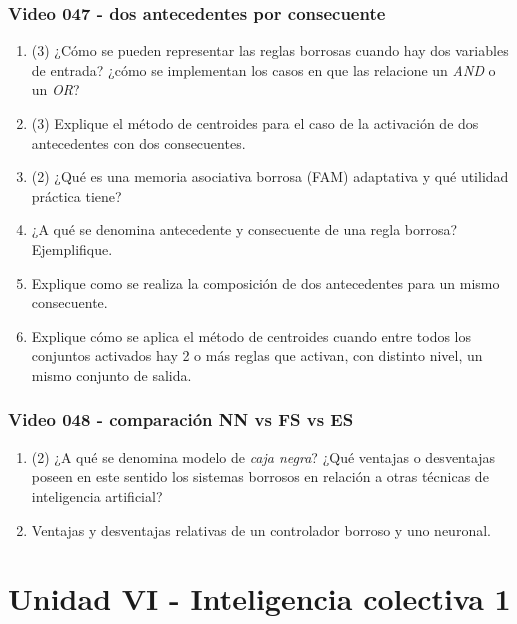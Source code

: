 \documentclass[a4paper,10pt,spanish]{article}
\begin{document}
\subsubsection{Video 047 - dos antecedentes por consecuente}

\begin{enumerate}
\item (3) ¿Cómo se pueden representar las reglas borrosas cuando hay dos variables de entrada? ¿cómo se implementan los casos en que las relacione un \textit{AND} o un \textit{OR}?

\item (3) Explique el método de centroides para el caso de la activación de dos antecedentes con dos consecuentes.

\item (2) ¿Qué es una memoria asociativa borrosa (FAM) adaptativa y qué utilidad práctica tiene?

\item ¿A qué se denomina antecedente y consecuente de una regla borrosa? Ejemplifique.

\item Explique como se realiza la composición de dos antecedentes para un mismo consecuente.

\item Explique cómo se aplica el método de centroides cuando entre todos los conjuntos activados hay 2 o más reglas que activan, con distinto nivel, un mismo conjunto de salida.
\end{enumerate}

\subsubsection{Video 048 - comparación NN vs FS vs ES}

\begin{enumerate}
\item (2) ¿A qué se denomina modelo de \textit{caja negra}? ¿Qué ventajas o desventajas poseen en este sentido los sistemas borrosos en relación a otras técnicas de inteligencia artificial?

\item Ventajas y desventajas relativas de un controlador borroso y uno neuronal.
\end{enumerate}

\newpage

\section{Unidad VI - Inteligencia colectiva 1}
\end{document}
